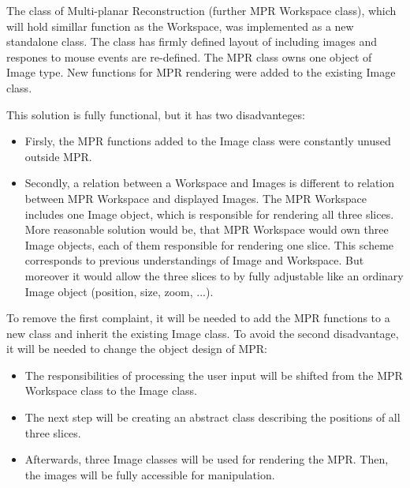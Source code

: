 The class of Multi-planar Reconstruction (further MPR Workspace class), which will hold simillar function as the Workspace, was implemented as a new standalone class. The class has firmly defined layout of including images and respones to mouse events are re-defined. The MPR class owns one object of Image type. New functions for MPR rendering were added to the existing Image class.

This solution is fully functional, but it has two disadvanteges:

\begin{itemize}
\item Firsly, the MPR functions added to the Image class were constantly unused outside MPR.
\item Secondly, a relation between a Workspace and Images is different to relation between MPR Workspace and displayed Images. The MPR Workspace includes one Image object, which is responsible for rendering all three slices. More reasonable solution would be, that MPR Workspace would own three Image objects, each of them responsible for rendering one slice. This scheme corresponds to previous understandings of Image and Workspace. But moreover it would allow the three slices to by fully adjustable like an ordinary Image object (position, size, zoom, ...). 
\end{itemize}

To remove the first complaint, it will be needed to add the MPR functions to a new class and inherit the existing Image class. To avoid the second disadvantage, it will be needed to change the object design of MPR:

\begin{itemize}
\item The responsibilities of processing the user input will be shifted from the MPR Workspace class to the Image class.
\item The next step will be creating an abstract class describing the positions of all three slices.
\item Afterwards, three Image classes will be used for rendering the MPR. Then, the images will be fully accessible for manipulation.
\end{itemize}



